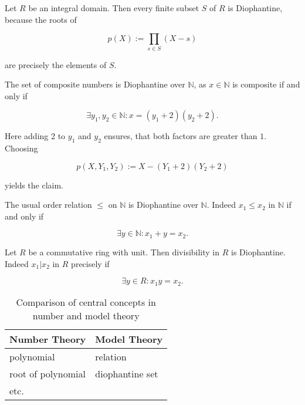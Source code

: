 \begin{exam}
    \begin{exlist}
        \item Let $R$ be an integral domain.
        Then every finite subset $S$ of $R$ is Diophantine, because the roots of 
        
        \[ p(X) := \prod_{s ∈ S} (X - s) \]
        
        are precisely the elements of $S$.
        
        \item The set of composite numbers is Diophantine over $ℕ$, as $x ∈ ℕ$ is composite if and only if
        
        \[ ∃ y_1, y_2 ∈ ℕ : x = (y_1 + 2) (y_2 + 2). \]
        
        Here adding $2$ to $y_1$ and $y_2$ ensures, that both factors are greater than $1$.
        Choosing
        
        \[ p (X, Y_1, Y_2) := X - (Y_1 + 2)(Y_2 + 2) \]
        
        yields the claim.
        
        \item The usual order relation $≤$ on $ℕ$ is Diophantine over $ℕ$.
        Indeed $x_1 ≤ x_2$ in $ℕ$ if and only if
        
        \[ ∃ y ∈ ℕ : x_1 + y  = x_2. \]
        
        \item Let $R$ be a commutative ring with unit.
        Then divisibility in $R$ is Diophantine.
        Indeed $x_1 | x_2$ in $R$ precisely if
       
        \[ ∃ y ∈ R : x_1 y = x_2. \]
        
    \end{exlist}
\end{exam}


\begin{table}
    \begin{tabular}{l l}
        \toprule
        Number Theory          & Model Theory \\
        \midrule
        polynomial         & relation          \\
        root of polynomial & diophantine set   \\
        etc.               &                   \\
        \bottomrule
    \end{tabular}
    \caption{Comparison of central concepts in number and model theory}
\end{table}